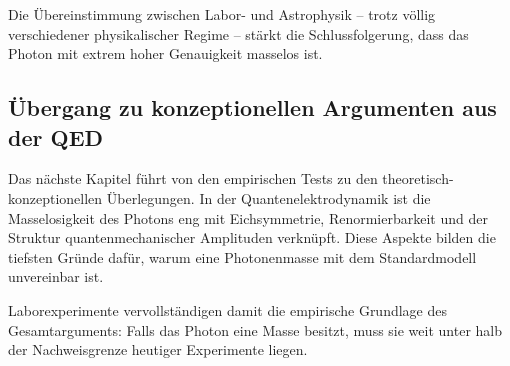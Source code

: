 Die Übereinstimmung zwischen Labor- und Astrophysik – trotz völlig 
verschiedener physikalischer Regime – stärkt die Schlussfolgerung, dass 
das Photon mit extrem hoher Genauigkeit masselos ist.

\subsection*{Übergang zu konzeptionellen Argumenten aus der QED}

Das nächste Kapitel führt von den empirischen Tests zu den 
theoretisch-konzeptionellen Überlegungen. In der 
Quantenelektrodynamik ist die Masselosigkeit des Photons eng mit 
Eichsymmetrie, Renormierbarkeit und der Struktur quantenmechanischer 
Amplituden verknüpft. Diese Aspekte bilden die tiefsten Gründe dafür, 
warum eine Photonenmasse mit dem Standardmodell unvereinbar ist.

Laborexperimente vervollständigen damit die empirische Grundlage des 
Gesamtarguments: Falls das Photon eine Masse besitzt, muss sie weit unter 
halb der Nachweisgrenze heutiger Experimente liegen.
